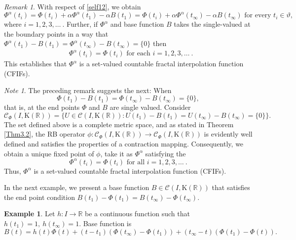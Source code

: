 \documentclass[12pt,oneside,reqno]{amsart}
\theoremstyle{definition}
\newtheorem{example}[theorem]{Example}
\theoremstyle{remark}
\newtheorem{remark}[theorem]{Remark}
\newtheorem{note}[theorem]{Note}
\begin{document}
\begin{remark}\label{rmrk3.3}
With respect of \eqref{self12}, we obtain
\[\Phi^{\alpha}(t_i)= \Phi(t_i) + \alpha  \Phi^{\alpha}(t_1) - \alpha B(t_1)=\Phi(t_i) + \alpha  \Phi^{\alpha}(t_\infty) - \alpha B(t_\infty) \text{ for every } t_i\in \vartheta, \] 
where $ i = 1,2,3,\dots~ $. Further, if $\Phi^{\alpha}$ and base function $B$ takes the single-valued at the boundary points in a way that $\Phi^{\alpha}(t_1) -  B(t_1)= \Phi^{\alpha}(t_\infty) -  B(t_\infty)=\{0\}$ then
\begin{equation*}
    \begin{aligned}
           &\Phi^{\alpha}(t_i)=\Phi(t_i)\text{ for each } i=1,2,3,\ldots~.
 \end{aligned}
 \end{equation*}
 This establishes that $\Phi^{\alpha}$ is a set-valued countable fractal interpolation function (CFIFs).
\end{remark}

\begin{note}\label{Nt3.4}
The preceding remark suggests the next: When  \[\Phi(t_1)-B(t_1)=\Phi(t_\infty)-B(t_\infty)=\{0\},\] that is, at the end points $\Phi$ and $B$ are single valued. Consider
\[\mathcal{C}_\Phi(I,\mathrm{K}( \mathbb{R}))= \Big\{ U \in \mathcal{C}(I,\mathrm{K}( \mathbb{R})): U(t_1)-B(t_1)= U(t_\infty)-B(t_\infty)=\{0\}\Big\}.\] The set defined above is a complete metric space, and as stated in Theorem \ref{Thm3.2}, the RB operator $\phi:\mathcal{C}_\Phi(I,\mathrm{K}( \mathbb{R})) \to \mathcal{C}_\Phi(I,\mathrm{K}( \mathbb{R}))$ is evidently well defined and satisfies the properties of a contraction mapping. Consequently, we obtain a unique fixed point of $\phi$, take it as $\Phi^\alpha$ satisfying the \[ \Phi^{\alpha}(t_i)=\Phi(t_i) \text{ for all } i=1,2,3,\ldots ~.\] Thus, $\Phi^{\alpha}$ is a set-valued countable fractal interpolation function (CFIFs).
\end{note}
In the next example, we present a  base function $B \in \mathcal{C}( I, \mathrm{K}( \mathbb{R}) )$ that satisfies the end point condition $B(t_1)-\Phi(t_1)=B(t_\infty)-\Phi(t_\infty).$  

\begin{example}
   
    Let $h:I \to \mathbb{R}$ be a continuous function such that $h(t_1)=1,~h(t_\infty)=1.$ Base function is
        \[ B(t)=h(t)\Phi(t)+(t-t_1)(\Phi(t_\infty)-\Phi(t_1))+(t_\infty -t)(\Phi(t_1)-\Phi(t)). \]
    
   \end{example}
\end{document}

